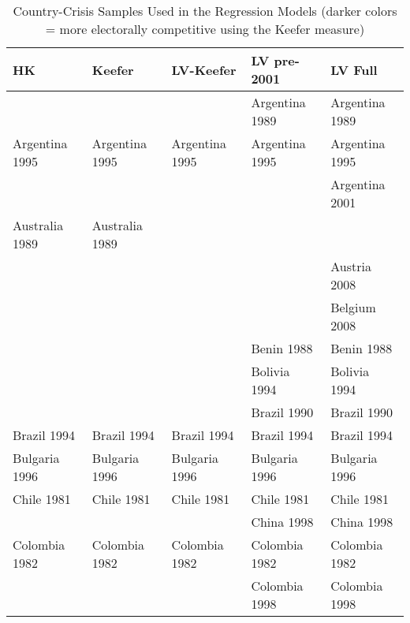 \begin{table}[ht]
\centering
\caption{Country-Crisis Samples Used in the Regression Models (darker colors = more electorally competitive using the Keefer measure)} 
\label{samplesTable}
{\tiny
\begin{tabular}{lllll}
  \hline
\textbf{HK} & \textbf{Keefer} & \textbf{LV-Keefer} & \textbf{LV pre-2001} & \textbf{LV Full} \\ 
  \hline
 &  &  & Argentina 1989\cellcolor[gray]{0.5} & Argentina 1989\cellcolor[gray]{0.5} \\ 
  Argentina 1995\cellcolor[gray]{0.5} & Argentina 1995\cellcolor[gray]{0.5} & Argentina 1995\cellcolor[gray]{0.5} & Argentina 1995\cellcolor[gray]{0.5} & Argentina 1995\cellcolor[gray]{0.5} \\ 
   &  &  &  & Argentina 2001\cellcolor[gray]{0.5} \\ 
  Australia 1989\cellcolor[gray]{0.5} & Australia 1989\cellcolor[gray]{0.5} &  &  &  \\ 
   &  &  &  & Austria 2008\cellcolor[gray]{0.5} \\ 
   &  &  &  & Belgium 2008\cellcolor[gray]{0.5} \\ 
   &  &  & Benin 1988\cellcolor[gray]{1} & Benin 1988\cellcolor[gray]{1} \\ 
   &  &  & Bolivia 1994\cellcolor[gray]{0.5} & Bolivia 1994\cellcolor[gray]{0.5} \\ 
   &  &  & Brazil 1990\cellcolor[gray]{0.5} & Brazil 1990\cellcolor[gray]{0.5} \\ 
  Brazil 1994\cellcolor[gray]{0.5} & Brazil 1994\cellcolor[gray]{0.5} & Brazil 1994\cellcolor[gray]{0.5} & Brazil 1994\cellcolor[gray]{0.5} & Brazil 1994\cellcolor[gray]{0.5} \\ 
  Bulgaria 1996\cellcolor[gray]{0.5} & Bulgaria 1996\cellcolor[gray]{0.5} & Bulgaria 1996\cellcolor[gray]{0.5} & Bulgaria 1996\cellcolor[gray]{0.5} & Bulgaria 1996\cellcolor[gray]{0.5} \\ 
  Chile 1981\cellcolor[gray]{1} & Chile 1981\cellcolor[gray]{1} & Chile 1981\cellcolor[gray]{1} & Chile 1981\cellcolor[gray]{1} & Chile 1981\cellcolor[gray]{1} \\ 
   &  &  & China 1998\cellcolor[gray]{1} & China 1998\cellcolor[gray]{1} \\ 
  Colombia 1982\cellcolor[gray]{0.5} & Colombia 1982\cellcolor[gray]{0.5} & Colombia 1982\cellcolor[gray]{0.5} & Colombia 1982\cellcolor[gray]{0.5} & Colombia 1982\cellcolor[gray]{0.5} \\ 
   &  &  & Colombia 1998\cellcolor[gray]{0.5} & Colombia 1998\cellcolor[gray]{0.5} \\ 

\end{tabular}}
\end{table}
